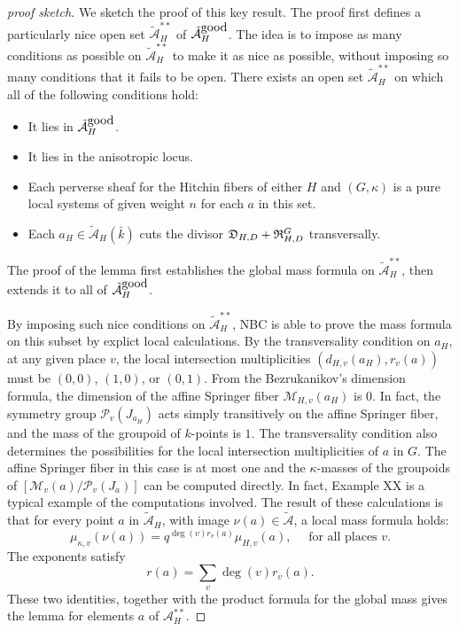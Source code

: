 \documentclass[brochure,english,12pt]{bourbaki}
\def\D{{\frak{D}}}
\def\R{{\frak{R}}}
\def\A{{\mathcal A}}
\def\M{{\mathcal M}}
\def\P{{\mathcal P}}
\def\tA{{\tilde{\mathcal A}}}
\begin{document}
\begin{proof}[proof sketch]
We sketch the proof of this key result.
The proof first defines a particularly nice  open set $\tA_H^{**}$ of $\tA_H^{\hbox{good}}$.
The idea is to impose as many conditions as possible on $\tA_H^{**}$ to make it as
nice as possible, without imposing so many conditions that it fails to be open.
There exists an open set $\tA_H^{**}$ on which all of the following conditions hold:
\begin{itemize}
\item It lies in $\tA_H^{\hbox{good}}$.
\item It lies in the anisotropic locus.
\item Each  perverse sheaf for the Hitchin fibers of 
either $H$ and $(G,\kappa)$ is a pure local systems of given weight $n$ for each $a$ in this set.
\item Each $a_H\in \tA_H(\bar k)$ cuts the divisor $\D_{H,D}+\R^G_{H,D}$ transversally.
\end{itemize}

The proof of the lemma first establishes the global mass formula on $\tA_H^{**}$, then
extends it to all of $\tA_H^{\hbox{good}}$.

By imposing such nice conditions on $\tA_H^{**}$,
NBC is able to prove the mass formula on this subset by explict local calculations. 
By the transversality
condition on $a_H$, at any given place $v$, the local intersection
multiplicities $(d_{H,v}(a_H),r_{v}(a))$ must be $(0,0)$,
$(1,0)$, or $(0,1)$.  From the Bezrukanikov's dimension formula, the
dimension of the affine Springer fiber $\M_{H,v}(a_H)$ is $0$.  In
fact, the symmetry group $\P_v(J_{a_H})$ acts simply transitively on
the affine Springer fiber, and the mass of the groupoid of $k$-points
is $1$.  The transversality condition also determines the
possibilities for the local intersection multiplicities of $a$ in $G$.
The affine Springer fiber in this case is at most one and the
$\kappa$-masses of the groupoids of $[\M_v(a)/\P_v(J_a)]$ can be
computed directly.  In fact, Example XX is a typical example of the
computations involved.  The result of these calculations is that for every point
$a$ in $\tA_H$, with image $\nu(a)\in \tA$, a local mass formula holds:
\[
\mu_{\kappa ,v}(\nu(a)) = q^{\deg(v) r_v(a)} \mu_{H,v} (a), \quad \text{ for all places } v.
\]
The exponents satisfy
\[
r(a) = \sum_v \deg(v) r_v(a).
\]
These two identities, together with the product formula for the global mass gives
the lemma for elements $a$ of $\A_H^{**}$.  


\end{proof}
\end{document}
